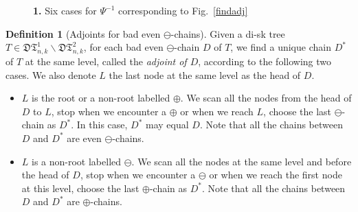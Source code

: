 \documentclass[12pt]{amsart}
\numberwithin{equation}{section}
\theoremstyle{plain}
\theoremstyle{definition}
\newtheorem{Def}[theorem]{Definition}
\def\D{\mathfrak{D}}
\def\T{\mathfrak{T}}
\begin{document}
\begin{figure}
\caption{{\bf1.} Six cases for $\Psi^{-1}$ corresponding to Fig.~\ref{findadj}}
\label{findL}
\end{figure}



\begin{Def}[Adjoints for bad even $\ominus$-chains]\label{L}
Given a di-sk tree $T\in \D\T^{1}_{n,k}\backslash \D\T^{2}_{n,k}$, for each bad even $\ominus$-chain $D$ of $T$, we find a unique chain $D^*$ of $T$ at the same level, called the {\em adjoint of $D$}, according to the following two cases. We also denote $L$ the last node at the same level as the head of $D$.
\begin{itemize}
\item[Case $I'$:] $L$ is the root or a non-root labelled $\oplus$. We scan all the nodes from the head of $D$ to $L$, stop when we encounter a $\oplus$ or when we reach $L$, choose the last $\ominus$-chain as $D^*$. In this case, $D^*$ may equal $D$. Note that all the chains between $D$ and $D^*$ are even $\ominus$-chains. 
\item[Case $II'$:] $L$ is a non-root labelled $\ominus$. We scan all the nodes at the same level and before the head of $D$, stop when we encounter a $\ominus$ or when we reach the first node at this level, choose the last $\oplus$-chain as $D^*$. Note that all the chains between $D$ and $D^*$ are $\oplus$-chains.
\end{itemize}










\end{Def}
 

 
 
\end{document}
